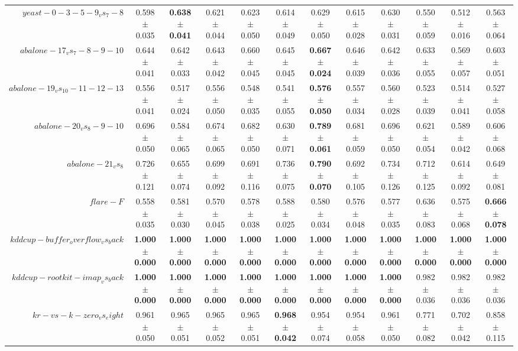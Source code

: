 \begin{table}[!ht]
{\begin{tabular}{r c c c c c c c c c c c}
$yeast-0-3-5-9_vs_7-8$ & 0.598 $\pm$ 0.035 & \textbf{0.638 $\pm$ 0.041} & 0.621 $\pm$ 0.044 & 0.623 $\pm$ 0.050 & 0.614 $\pm$ 0.049 & 0.629 $\pm$ 0.050 & 0.615 $\pm$ 0.028 & 0.630 $\pm$ 0.031 & 0.550 $\pm$ 0.059 & 0.512 $\pm$ 0.016 & 0.563 $\pm$ 0.064 \\
$abalone-17_vs_7-8-9-10$ & 0.644 $\pm$ 0.041 & 0.642 $\pm$ 0.033 & 0.643 $\pm$ 0.042 & 0.660 $\pm$ 0.045 & 0.645 $\pm$ 0.045 & \textbf{0.667 $\pm$ 0.024} & 0.646 $\pm$ 0.039 & 0.642 $\pm$ 0.036 & 0.633 $\pm$ 0.055 & 0.569 $\pm$ 0.057 & 0.603 $\pm$ 0.051 \\
$abalone-19_vs_10-11-12-13$ & 0.556 $\pm$ 0.041 & 0.517 $\pm$ 0.024 & 0.556 $\pm$ 0.050 & 0.548 $\pm$ 0.035 & 0.541 $\pm$ 0.055 & \textbf{0.576 $\pm$ 0.050} & 0.557 $\pm$ 0.034 & 0.560 $\pm$ 0.028 & 0.523 $\pm$ 0.039 & 0.514 $\pm$ 0.041 & 0.527 $\pm$ 0.058 \\
$abalone-20_vs_8-9-10$ & 0.696 $\pm$ 0.050 & 0.584 $\pm$ 0.065 & 0.674 $\pm$ 0.065 & 0.682 $\pm$ 0.050 & 0.630 $\pm$ 0.071 & \textbf{0.789 $\pm$ 0.061} & 0.681 $\pm$ 0.059 & 0.696 $\pm$ 0.050 & 0.621 $\pm$ 0.054 & 0.589 $\pm$ 0.042 & 0.606 $\pm$ 0.068 \\
$abalone-21_vs_8$ & 0.726 $\pm$ 0.121 & 0.655 $\pm$ 0.074 & 0.699 $\pm$ 0.092 & 0.691 $\pm$ 0.116 & 0.736 $\pm$ 0.075 & \textbf{0.790 $\pm$ 0.070} & 0.692 $\pm$ 0.105 & 0.734 $\pm$ 0.126 & 0.712 $\pm$ 0.125 & 0.614 $\pm$ 0.092 & 0.649 $\pm$ 0.081 \\
$flare-F$ & 0.558 $\pm$ 0.035 & 0.581 $\pm$ 0.030 & 0.570 $\pm$ 0.045 & 0.578 $\pm$ 0.038 & 0.588 $\pm$ 0.025 & 0.580 $\pm$ 0.034 & 0.576 $\pm$ 0.048 & 0.577 $\pm$ 0.035 & 0.636 $\pm$ 0.083 & 0.575 $\pm$ 0.068 & \textbf{0.666 $\pm$ 0.078} \\
$kddcup-buffer_overflow_vs_back$ & \textbf{1.000 $\pm$ 0.000} & \textbf{1.000 $\pm$ 0.000} & \textbf{1.000 $\pm$ 0.000} & \textbf{1.000 $\pm$ 0.000} & \textbf{1.000 $\pm$ 0.000} & \textbf{1.000 $\pm$ 0.000} & \textbf{1.000 $\pm$ 0.000} & \textbf{1.000 $\pm$ 0.000} & \textbf{1.000 $\pm$ 0.000} & \textbf{1.000 $\pm$ 0.000} & \textbf{1.000 $\pm$ 0.000} \\
$kddcup-rootkit-imap_vs_back$ & \textbf{1.000 $\pm$ 0.000} & \textbf{1.000 $\pm$ 0.000} & \textbf{1.000 $\pm$ 0.000} & \textbf{1.000 $\pm$ 0.000} & \textbf{1.000 $\pm$ 0.000} & \textbf{1.000 $\pm$ 0.000} & \textbf{1.000 $\pm$ 0.000} & \textbf{1.000 $\pm$ 0.000} & 0.982 $\pm$ 0.036 & 0.982 $\pm$ 0.036 & 0.982 $\pm$ 0.036 \\
$kr-vs-k-zero_vs_eight$ & 0.961 $\pm$ 0.050 & 0.965 $\pm$ 0.051 & 0.965 $\pm$ 0.052 & 0.965 $\pm$ 0.051 & \textbf{0.968 $\pm$ 0.042} & 0.954 $\pm$ 0.074 & 0.954 $\pm$ 0.058 & 0.961 $\pm$ 0.050 & 0.771 $\pm$ 0.082 & 0.702 $\pm$ 0.042 & 0.858 $\pm$ 0.115 \\

\end{tabular}}
\end{table}
